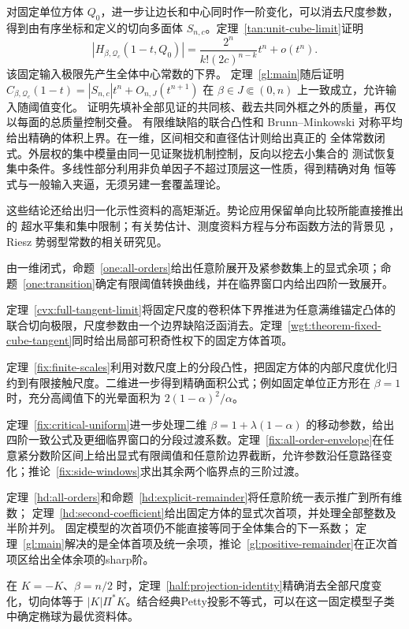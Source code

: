 对固定单位方体 $Q_0$，进一步让边长和中心同时作一阶变化，可以消去尺度参数，
得到由有序坐标和定义的切向多面体 $S_{n,c}$。定理~\ref{tan:unit-cube-limit}证明
\[
 |H_{\beta,\mathcal Q_c}(1-t,Q_0)|
 =\frac{2^n}{k!(2c)^{n-k}}t^n+o(t^n).
\]
该固定输入极限先产生全体中心常数的下界。
定理~\ref{gl:main}随后证明
$C_{\beta,\mathcal Q_c}(1-t)=|S_{n,c}|t^n+O_{n,J}(t^{n+1})$
在 $\beta\in J\Subset(0,n)$ 上一致成立，允许输入随阈值变化。
证明先填补全部见证的共同核、截去共同外框之外的质量，再仅以每面的总质量控制交叠。
有限维缺陷的联合凸性和 Brunn--Minkowski 对称平均给出精确的体积上界。在一维，区间相交和直径估计则给出真正的
全体常数闭式。外层权的集中模量由同一见证聚拢机制控制，反向以挖去小集合的
测试恢复集中条件。多线性部分利用非负单因子不超过顶层这一性质，得到精确对角
恒等式与一般输入夹逼，无须另建一套覆盖理论。

这些结论还给出归一化示性资料的高矩渐近。势论应用保留单向比较所能直接推出的
超水平集和集中限制；有关势估计、测度资料方程与分布函数方法的背景见
\cite{KilpelainenMaly1994,KuusiMingione2014,PhucVerbitsky2022,NguyenTran2021}，
Riesz 势弱型常数的相关研究见\cite{HuangTang2023}。

由一维闭式，命题~\ref{one:all-orders}给出任意阶展开及紧参数集上的显式余项；命题~\ref{one:transition}确定有限阈值转换曲线，并在临界窗口内给出四阶一致展开。

定理~\ref{cvx:full-tangent-limit}将固定尺度的卷积体下界推进为任意满维锚定凸体的联合切向极限，尺度参数由一个边界缺陷泛函消去。定理~\ref{wgt:theorem-fixed-cube-tangent}同时给出局部可积奇性权下的固定方体首项。

定理~\ref{fix:finite-scales}利用对数尺度上的分段凸性，把固定方体的内部尺度优化归约到有限接触尺度。二维进一步得到精确面积公式；例如固定单位正方形在 $\beta=1$ 时，充分高阈值下的光晕面积为 $2(1-\alpha)^2/\alpha$。

定理~\ref{fix:critical-uniform}进一步处理二维 $\beta=1+\lambda(1-\alpha)$ 的移动参数，给出四阶一致公式及更细临界窗口的分段过渡系数。定理~\ref{fix:all-order-envelope}在任意紧分数阶区间上给出显式有限阈值和任意阶边界截断，允许参数沿任意路径变化；推论~\ref{fix:side-windows}求出其余两个临界点的三阶过渡。

定理~\ref{hd:all-orders}和命题~\ref{hd:explicit-remainder}将任意阶统一表示推广到所有维数；
定理~\ref{hd:second-coefficient}给出固定方体的显式次首项，并处理全部整数及半阶并列。
固定模型的次首项仍不能直接等同于全体集合的下一系数；
定理~\ref{gl:main}解决的是全体首项及统一余项，推论~\ref{gl:positive-remainder}在正次首项区给出全体余项的sharp阶。

在 $K=-K$、$\beta=n/2$ 时，定理~\ref{half:projection-identity}精确消去全部尺度变化，切向体等于 $|K|\Pi^*K$。结合经典Petty投影不等式，可以在这一固定模型子类中确定椭球为最优资料体。

